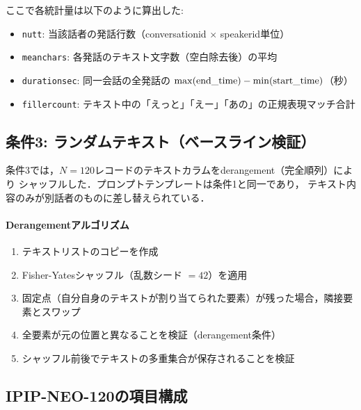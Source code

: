 \documentclass[dvipdfmx,11pt,a4paper]{bxjsarticle}
\renewcommand{\_}{\paperorigunderscore\allowbreak}%
\begin{document}
ここで各統計量は以下のように算出した:
\begin{itemize}
  \item \texttt{n\_utt}: 当該話者の発話行数（conversation\_id $\times$ speaker\_id単位）
  \item \texttt{mean\_chars}: 各発話のテキスト文字数（空白除去後）の平均
  \item \texttt{duration\_sec}: 同一会話の全発話の $\max(\text{end\_time}) - \min(\text{start\_time})$（秒）
  \item \texttt{filler\_count}: テキスト中の「えっと」「えー」「あの」の正規表現マッチ合計
\end{itemize}

\subsection{条件3: ランダムテキスト（ベースライン検証）}
\label{sec:appendix_prompt_cond3}

条件3では，$N = 120$レコードのテキストカラムをderangement（完全順列）により
シャッフルした．プロンプトテンプレートは条件1と同一であり，
テキスト内容のみが別話者のものに差し替えられている．

\paragraph{Derangementアルゴリズム}
\begin{enumerate}
  \item テキストリストのコピーを作成
  \item Fisher-Yatesシャッフル（乱数シード $= 42$）を適用
  \item 固定点（自分自身のテキストが割り当てられた要素）が残った場合，隣接要素とスワップ
  \item 全要素が元の位置と異なることを検証（derangement条件）
  \item シャッフル前後でテキストの多重集合が保存されることを検証
\end{enumerate}

\subsection{IPIP-NEO-120の項目構成}
\label{sec:appendix_ipip}
\end{document}

